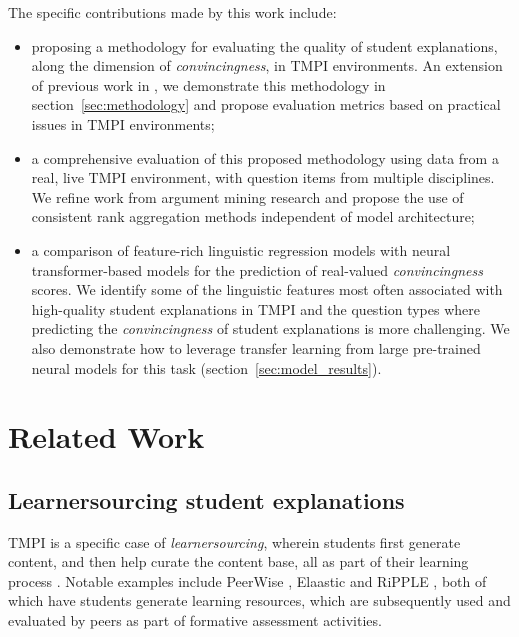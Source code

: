 \documentclass[notitlepage,12pt]{jedm}
\begin{document}
The specific contributions made by this work include:
\begin{itemize}
	\item proposing a methodology for evaluating the quality of student 
	explanations, along the dimension of \textit{convincingness}, in TMPI 
	environments. 
	An extension of previous work in , we 
	demonstrate this methodology in section~\ref{sec:methodology} and 
	propose evaluation metrics based on practical issues in TMPI environments;
	
	\item a comprehensive evaluation of this proposed methodology using data 
	from a real, live TMPI environment, with question items from multiple 
	disciplines. 
	We refine work from argument mining research and propose the use of 
	consistent rank aggregation methods independent of model architecture;
	
	\item a comparison of feature-rich linguistic regression models with 
	neural transformer-based models for the prediction of real-valued
	\textit{convincingness} scores. 
	We identify some of the linguistic features most often associated with 
	high-quality student explanations in TMPI and the question types where 
	predicting the \textit{convincingness} of student explanations is more 
	challenging.
	We also demonstrate how to leverage transfer learning from large 
	pre-trained neural models for this task (section~\ref{sec:model_results}).
\end{itemize}


\section{Related Work}\label{sec:related_work}

\subsection{Learnersourcing student explanations}
TMPI is a specific case of  \textit{learnersourcing}, wherein students first generate content, and 
then help curate the content base, all as part of their learning process \cite{singh2022learnersourcing,weir_learnersourcing_2015}.
Notable examples include PeerWise \cite{denny_peerwise:_2008}, Elaastic \cite{parmentier2019de,silvestre2015reflexive} and RiPPLE 
\cite{khosravi_ripple_2019}, both of which have students generate learning 
resources, which are subsequently used and evaluated by peers as part of 
formative assessment activities.
\end{document}
